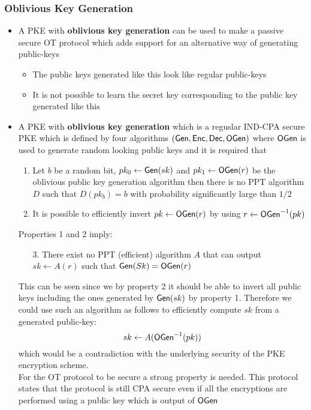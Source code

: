 \subsubsection{Oblivious Key Generation}
\begin{itemize}
    \item A PKE with \textbf{oblivious key generation} can be used to make a passive secure OT protocol which adds support for an alternative way of generating public-keys
    \begin{itemize}
        \item The public keys generated like this look like regular public-keys
        \item It is not possible to learn the secret key corresponding to the public key generated like this
    \end{itemize}
    \item A PKE with \textbf{oblivious key generation} which is a reguslar IND-CPA secure PKE which is defined by four algorithms $(\mathsf{Gen}, \mathsf{Enc}, \mathsf{Dec}, \mathsf{OGen})$ where $\mathsf{OGen}$ is used to generate random looking public keys and it is required that
    \begin{enumerate}
        \item Let $b$ be a random bit, $pk_0 \leftarrow \mathsf{Gen}(sk)$ and $pk_1 \leftarrow \mathsf{OGen}(r)$ be the oblivious public key generation algorithm then there is no PPT algorithm $D$ such that $D(pk_b) = b$ with probability significantly large than $1/2$
        \item It is possible to efficiently invert $pk \leftarrow \mathsf{OGen}(r)$ by using $r \leftarrow \mathsf{OGen}^{-1}(pk)$
    \end{enumerate}
    Properties 1 and 2 imply:
    \begin{enumerate}
        \item[3.] There exist no PPT (efficient) algorithm $A$ that can output $sk \leftarrow A(r)$ such that $\mathsf{Gen}(Sk) = \mathsf{OGen}(r)$
    \end{enumerate}
    This can be seen since we by property 2 it should be able to invert all public keys including the ones generated by $\mathsf{Gen}(sk)$ by property 1. Therefore we could use such an algorithm as follows to efficiently compute $sk$ from a generated public-key:
    \begin{equation*}
        sk \leftarrow A(\mathsf{OGen}^{-1}(pk))
    \end{equation*}
    which would be a contradiction with the underlying security of the PKE encryption scheme. 
    \\
    For the OT protocol to be secure a strong property is needed. This protocol states that the protocol is still CPA secure even if all the encryptions are performed using a public key which is output of $\mathsf{OGen}$

\end{itemize}
